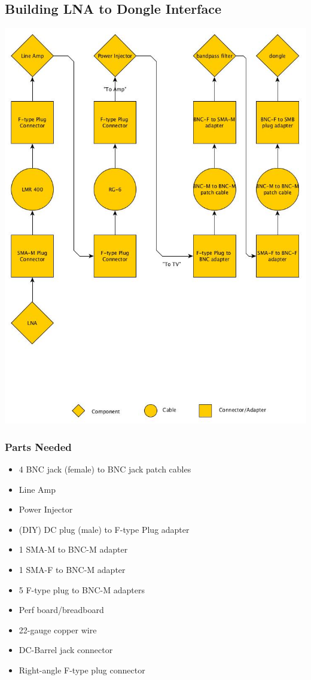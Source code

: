 \documentclass[11pt]{article} %
\begin{document}
\subsection{Building LNA to Dongle Interface}

\begin{center}
\includegraphics[scale=0.35]{lnainterface/01.jpeg}
\end{center}


\subsubsection{Parts Needed}
\begin{multicols}{2}
\begin{itemize}
\item 4 BNC jack (female) to BNC jack patch cables
\item Line Amp
\item Power Injector
\item (DIY) DC plug (male) to F-type Plug adapter
\item 1 SMA-M to BNC-M adapter
\item 1 SMA-F to BNC-M adapter
\item 5 F-type plug to BNC-M adapters
\item Perf board/breadboard
\item 22-gauge copper wire
\item DC-Barrel jack connector
\item Right-angle F-type plug connector
\end{itemize}
\end{multicols}
\end{document}
